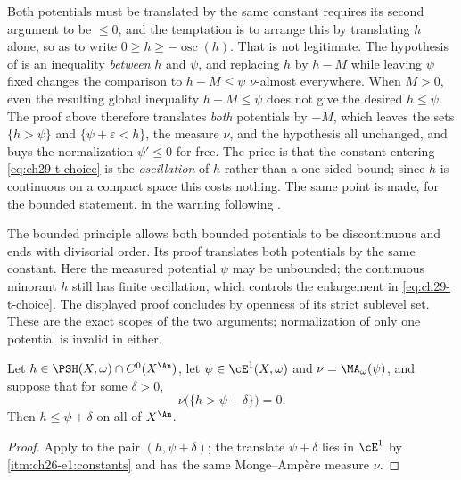 \begin{warning}{Both potentials must be translated by the same constant}
\label{warn:ch29-same-translation}
 requires its second argument to be
$\leq0$, and the temptation is to arrange this by translating $h$ alone,
so as to write $0\geq h\geq-\operatorname{osc}(h)$.  That is not
legitimate.  The hypothesis of  is an
inequality \emph{between} $h$ and $\psi$, and replacing $h$ by
$h-M$ while leaving $\psi$ fixed changes the comparison to
$h-M\leq\psi$ $\nu$-almost everywhere.  When $M>0$, even the resulting
global inequality $h-M\leq\psi$ does not give the desired $h\leq\psi$.  The
proof above therefore translates \emph{both} potentials by $-M$, which
leaves the sets $\{h>\psi\}$ and $\{\psi+\varepsilon<h\}$, the measure
$\nu$, and the hypothesis all unchanged, and buys the normalization
$\psi'\leq0$ for free.  The price is that the constant entering
\eqref{eq:ch29-t-choice} is the \emph{oscillation} of $h$ rather than a
one-sided bound; since $h$ is continuous on a compact space this costs
nothing.  The same point is made, for the bounded statement, in the warning
following .
\end{warning}

\begin{remark}
\label{rem:ch29-bounded-vs-e1-domination}
The bounded principle  allows
both bounded potentials to be discontinuous and ends with divisorial
order.  Its proof translates both potentials by the same constant.
Here the measured potential $\psi$ may be unbounded; the continuous
minorant $h$ still has finite oscillation, which controls the enlargement
in \eqref{eq:ch29-t-choice}.  The displayed proof concludes by openness
of its strict sublevel set.  These are the exact scopes of the two
arguments; normalization of only one potential is invalid in either.
\end{remark}

\begin{corollary}
\label{cor:ch29-domination-quantitative}
Let $h\in\PSH(X,\omega)\cap C^0(X^{\An})$, let
$\psi\in\cE^1(X,\omega)$ and $\nu=\MA_\omega(\psi)$, and suppose that
for some $\delta>0$,
\[
 \nu\bigl(\{h>\psi+\delta\}\bigr)=0 .
\]
Then $h\leq\psi+\delta$ on all of $X^{\An}$.
\end{corollary}

\begin{proof}
Apply  to the pair $(h,\psi+\delta)$;
the translate $\psi+\delta$ lies in $\cE^1$ by
\,\cref{itm:ch26-e1:constants} and has the same
Monge--Amp\`ere measure $\nu$.
\end{proof}

